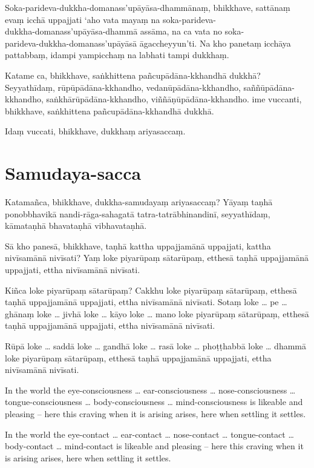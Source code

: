 \paliPage

Soka-parideva-dukkha-domanass'upāyāsa-dhammānaṃ, bhikkhave, sattānaṃ evaṃ icchā
uppajjati ‘aho vata mayaṃ na soka-parideva-\\
dukkha-domanass'upāyāsa-dhammā assāma, na ca vata no soka-\\
parideva-dukkha-domanass'upāyāsā āgaccheyyun’ti. Na kho panetaṃ icchāya
pattabbaṃ, idampi yampicchaṃ na labhati tampi dukkhaṃ.

Katame ca, bhikkhave, saṅkhittena pañcupādāna-kkhandhā dukkhā? Seyyathīdaṃ,
rūpūpādāna-kkhandho, vedanūpādāna-kkhandho, saññūpādāna-kkhandho,
saṅkhārūpādāna-kkhandho, viññāṇūpādāna-kkhandho. ime vuccanti, bhikkhave,
saṅkhittena pañcupādāna-kkhandhā dukkhā.

Idaṃ vuccati, bhikkhave, dukkhaṃ ariyasaccaṃ.

\section*{Samudaya-sacca}

Katamañca, bhikkhave, dukkha-samudayaṃ ariyasaccaṃ? Yāyaṃ taṇhā ponobbhavikā
nandi-rāga-sahagatā tatra-tatrābhinandinī, seyyathīdaṃ, kāmataṇhā bhavataṇhā
vibhavataṇhā.

Sā kho panesā, bhikkhave, taṇhā kattha uppajjamānā uppajjati, kattha nivīsamānā
nivīsati? Yaṃ loke piyarūpaṃ sātarūpaṃ, etthesā taṇhā uppajjamānā uppajjati,
ettha nivīsamānā nivīsati.

\enlargethispage{\baselineskip}

Kiñca loke piyarūpaṃ sātarūpaṃ? Cakkhu loke piyarūpaṃ sātarūpaṃ, etthesā taṇhā
uppajjamānā uppajjati, ettha nivīsamānā nivīsati. Sotaṃ loke \ldots{} pe
\ldots{} ghānaṃ loke \ldots{} jivhā loke \ldots{} kāyo loke \ldots{} mano loke
piyarūpaṃ sātarūpaṃ, etthesā taṇhā uppajjamānā uppajjati, ettha nivīsamānā
nivīsati.

Rūpā loke \ldots{} saddā loke \ldots{} gandhā loke \ldots{} rasā loke \ldots{}
phoṭṭhabbā loke \ldots{} dhammā loke piyarūpaṃ sātarūpaṃ, etthesā taṇhā
uppajjamānā uppajjati, ettha nivīsamānā nivīsati.

\englishPage

In the world the eye-consciousness \ldots{} ear-consciousness \ldots{} nose-consciousness
 \ldots{} tongue-consciousness \ldots{} body-consciousness \ldots{} mind-consciousness is likeable
and pleasing -- here this craving when it is arising arises, here when settling
it settles.

In the world the eye-contact \ldots{} ear-contact \ldots{} nose-contact \ldots{}
tongue-contact \ldots{} body-contact \ldots{} mind-contact is likeable and
pleasing -- here this craving when it is arising arises, here when settling it
settles.

